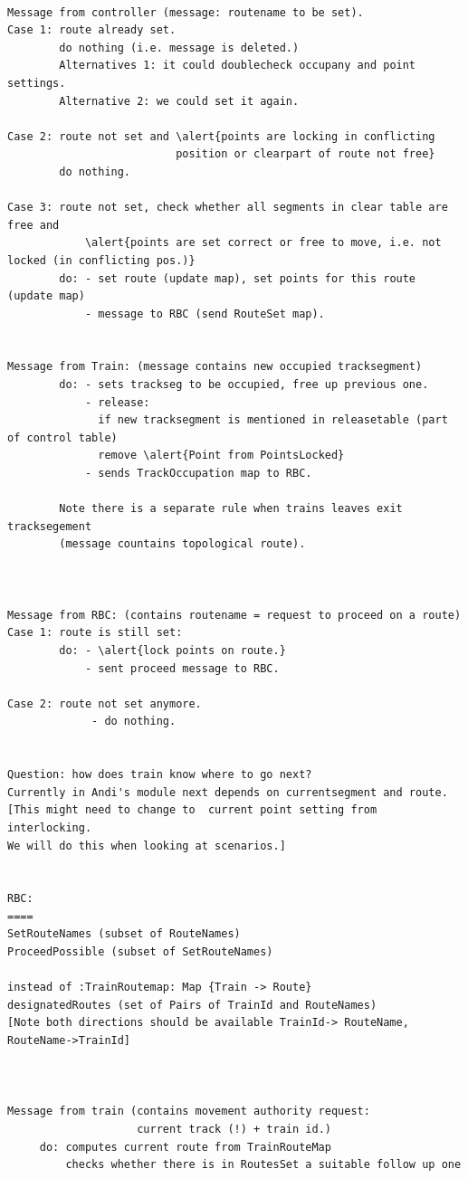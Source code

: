 \begin{verbatim}

Message from controller (message: routename to be set).
Case 1: route already set.
        do nothing (i.e. message is deleted.)
        Alternatives 1: it could doublecheck occupany and point settings.
        Alternative 2: we could set it again. 

Case 2: route not set and \alert{points are locking in conflicting 
                          position or clearpart of route not free}
        do nothing.

Case 3: route not set, check whether all segments in clear table are free and 
            \alert{points are set correct or free to move, i.e. not locked (in conflicting pos.)}
        do: - set route (update map), set points for this route (update map)
            - message to RBC (send RouteSet map).
          

Message from Train: (message contains new occupied tracksegment)
        do: - sets trackseg to be occupied, free up previous one.
            - release: 
              if new tracksegment is mentioned in releasetable (part of control table)
              remove \alert{Point from PointsLocked}
            - sends TrackOccupation map to RBC.
               
        Note there is a separate rule when trains leaves exit tracksegement
        (message countains topological route).

         
          
Message from RBC: (contains routename = request to proceed on a route)
Case 1: route is still set:
        do: - \alert{lock points on route.}
            - sent proceed message to RBC.
 
Case 2: route not set anymore.
             - do nothing.


Question: how does train know where to go next?
Currently in Andi's module next depends on currentsegment and route. 
[This might need to change to  current point setting from interlocking. 
We will do this when looking at scenarios.]


RBC:
====
SetRouteNames (subset of RouteNames)
ProceedPossible (subset of SetRouteNames) 

instead of :TrainRoutemap: Map {Train -> Route}
designatedRoutes (set of Pairs of TrainId and RouteNames) 
[Note both directions should be available TrainId-> RouteName, RouteName->TrainId]



Message from train (contains movement authority request:
                    current track (!) + train id.)
     do: computes current route from TrainRouteMap
         checks whether there is in RoutesSet a suitable follow up one


\end{verbatim}
